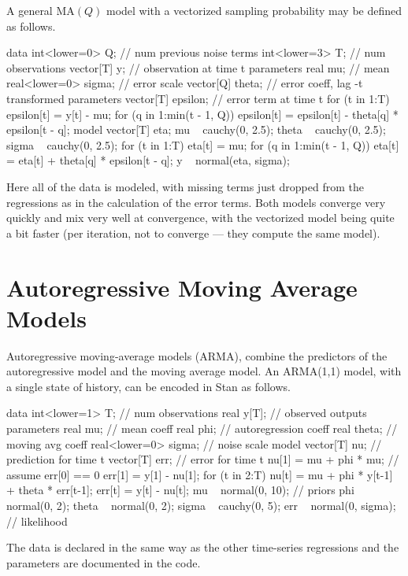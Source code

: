 A general $\mbox{MA}(Q)$ model with a vectorized sampling probability
may be defined as follows.
%
\begin{stancode}
data {
  int<lower=0> Q;  // num previous noise terms
  int<lower=3> T;  // num observations
  vector[T] y;     // observation at time t
}
parameters {
  real mu;              // mean
  real<lower=0> sigma;  // error scale
  vector[Q] theta;      // error coeff, lag -t
}
transformed parameters {
  vector[T] epsilon;    // error term at time t
  for (t in 1:T) {
    epsilon[t] = y[t] - mu;
    for (q in 1:min(t - 1, Q))
      epsilon[t] = epsilon[t] - theta[q] * epsilon[t - q];
  }
}
model {
  vector[T] eta;
  mu ~ cauchy(0, 2.5);
  theta ~ cauchy(0, 2.5);
  sigma ~ cauchy(0, 2.5);
  for (t in 1:T) {
    eta[t] = mu;
    for (q in 1:min(t - 1, Q))
      eta[t] = eta[t] + theta[q] * epsilon[t - q];
  }
  y ~ normal(eta, sigma);
}
\end{stancode}
%
Here all of the data is modeled, with missing terms just dropped from
the regressions as in the calculation of the error terms.  Both models
converge very quickly and mix very well at convergence, with the
vectorized model being quite a bit faster (per iteration, not to
converge --- they compute the same model).


\section{Autoregressive Moving Average Models}

Autoregressive moving-average models (ARMA), combine the predictors
of the autoregressive model and the moving average model.  An
ARMA(1,1) model, with a single state of history, can be encoded in
Stan as follows.
%
\begin{stancode}
data {
  int<lower=1> T;            // num observations
  real y[T];                 // observed outputs
}
parameters {
  real mu;                   // mean coeff
  real phi;                  // autoregression coeff
  real theta;                // moving avg coeff
  real<lower=0> sigma;       // noise scale
}
model {
  vector[T] nu;              // prediction for time t
  vector[T] err;             // error for time t
  nu[1] = mu + phi * mu;    // assume err[0] == 0
  err[1] = y[1] - nu[1];
  for (t in 2:T) {
    nu[t] = mu + phi * y[t-1] + theta * err[t-1];
    err[t] = y[t] - nu[t];
  }
  mu ~ normal(0, 10);         // priors
  phi ~ normal(0, 2);
  theta ~ normal(0, 2);
  sigma ~ cauchy(0, 5);
  err ~ normal(0, sigma);    // likelihood
}
\end{stancode}
%
The data is declared in the same way as the other time-series
regressions and the parameters are documented in the code.

